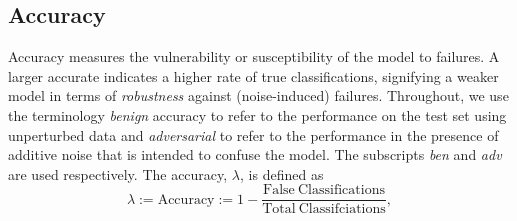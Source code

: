 \documentclass[conference]{IEEEtran}
\begin{document}
\subsection{Accuracy}
\label{acc}

Accuracy measures the vulnerability or susceptibility of the model to failures. A larger accurate indicates a higher rate of true classifications, signifying a weaker model in terms of \textit{robustness} against (noise-induced) failures. Throughout, we use the terminology \textit{benign} accuracy to refer to the performance on the test set using unperturbed data and \textit{adversarial} to refer to the performance in the presence of additive noise that is intended to confuse the model. The subscripts \textit{ben} and \textit{adv} are used respectively. The accuracy, $\lambda$, is defined as
\begin{equation}
    \lambda:= \mathrm{Accuracy} := 1 - \frac{\mathrm{False~Classifications}}{\mathrm{Total~Classifciations}},
    \label{eq:acc}
\end{equation}
\end{document}
